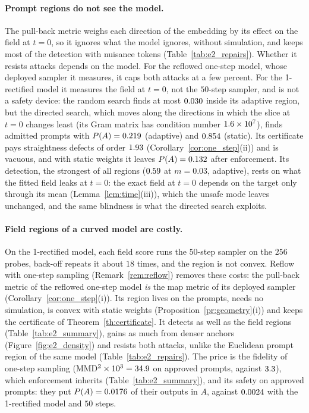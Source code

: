 \documentclass{article}
\theoremstyle{plain}
\theoremstyle{remark}
\begin{document}
\paragraph{Prompt regions do not see the model.}
The pull-back metric weighs each direction of the embedding by its effect on the field at $t=0$, so it ignores what the model
ignores, without simulation, and keeps most of the detection with nuisance tokens (Table~\ref{tab:e2_repairs}). Whether it resists attacks
depends on the model. For the reflowed one-step model, whose deployed sampler it measures, it caps both attacks at a few percent. For
the 1-rectified model it measures the field at $t=0$, not the $50$-step sampler, and is not a safety device: the random search finds
at most $0.030$ inside its adaptive region, but the directed search, which moves along the directions in which the slice at $t=0$
changes least (its Gram matrix has condition number $1.6\times10^{7}$), finds admitted prompts with $P(A)=0.219$ (adaptive) and
$0.854$ (static). Its certificate pays straightness defects of order $1.93$ (Corollary~\ref{cor:one_step}(ii)) and is vacuous,
and with static weights it leaves $P(A)=0.132$ after enforcement. Its detection, the strongest of all regions ($0.59$ at
$m=0.03$, adaptive), rests on what the fitted field leaks at $t=0$: the exact field at $t=0$ depends on the target only through its mean
(Lemma~\ref{lem:time}(iii)), which the unsafe mode leaves unchanged, and the same blindness is what the directed search exploits.

\paragraph{Field regions of a curved model are costly.}
On the 1-rectified model, each field score runs the $50$-step sampler on the $256$ probes, back-off repeats it about $18$ times, and
the region is not convex. Reflow with one-step sampling (Remark~\ref{rem:reflow}) removes these costs: the pull-back metric of the
reflowed one-step model \emph{is} the map metric of its deployed sampler (Corollary~\ref{cor:one_step}(i)). Its region lives on the
prompts, needs no simulation, is convex with static weights (Proposition~\ref{pr:geometry}(i)) and keeps the certificate of
Theorem~\ref{th:certificate}. It detects as well as the field regions (Table~\ref{tab:e2_summary}), gains as much from denser anchors
(Figure~\ref{fig:e2_density}) and resists both attacks, unlike the Euclidean prompt region of the same model (Table~\ref{tab:e2_repairs}).
The price is the fidelity of one-step sampling (MMD$^2\times10^3=34.9$ on approved prompts, against $3.3$), which
enforcement inherits (Table~\ref{tab:e2_summary}), and its safety on approved prompts: they put $P(A)=0.0176$ of their outputs in
$A$, against $0.0024$ with the 1-rectified model and $50$ steps.
\FloatBarrier
\end{document}
